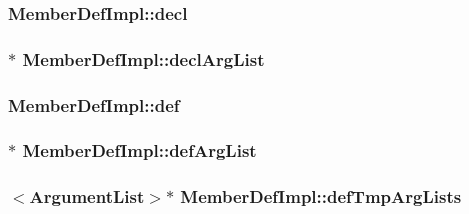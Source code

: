 \subsubsection[{decl}]{ Member\+Def\+Impl\+::decl}\label{class_member_def_impl_a76a463fae487c0e63e7e81ea774af2ee}
\hypertarget{class_member_def_impl_ad87b77f6e6f285e7dbd1ce31e9da0f78}{}
\subsubsection[{decl\+Arg\+List}]{$\ast$ Member\+Def\+Impl\+::decl\+Arg\+List}\label{class_member_def_impl_ad87b77f6e6f285e7dbd1ce31e9da0f78}
\hypertarget{class_member_def_impl_a27a432e4fe7f8fb2f33b570ee665a4c6}{}
\subsubsection[{def}]{ Member\+Def\+Impl\+::def}\label{class_member_def_impl_a27a432e4fe7f8fb2f33b570ee665a4c6}
\hypertarget{class_member_def_impl_a1898d617ffa6e325ee27a92bba71e51e}{}
\subsubsection[{def\+Arg\+List}]{$\ast$ Member\+Def\+Impl\+::def\+Arg\+List}\label{class_member_def_impl_a1898d617ffa6e325ee27a92bba71e51e}
\hypertarget{class_member_def_impl_a4d00872de77e13c3b707b4a8db704aad}{}
\subsubsection[{def\+Tmp\+Arg\+Lists}]{$<${\bf Argument\+List}$>$$\ast$ Member\+Def\+Impl\+::def\+Tmp\+Arg\+Lists}\label{class_member_def_impl_a4d00872de77e13c3b707b4a8db704aad}
\hypertarget{class_member_def_impl_a632a1bf5aac7252704eac08788f5720c}{}
